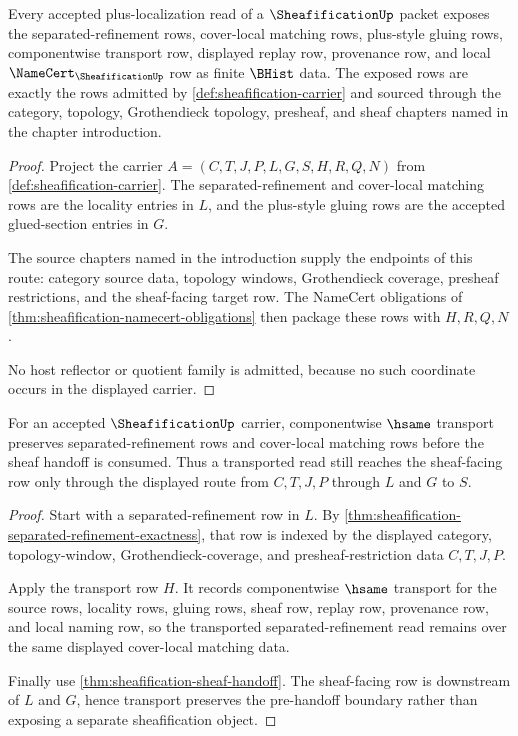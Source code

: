 \begin{theorem}
\label{thm:sheafification-plus-localization-carrier-admission}
Every accepted plus-localization read of a $\SheafificationUp$ packet exposes the separated-refinement rows, cover-local matching rows, plus-style gluing rows, componentwise transport row, displayed replay row, provenance row, and local $\NameCert_{\SheafificationUp}$ row as finite $\BHist$ data. The exposed rows are exactly the rows admitted by \autoref{def:sheafification-carrier} and sourced through the category, topology, Grothendieck topology, presheaf, and sheaf chapters named in the chapter introduction.
\end{theorem}
\begin{proof}
Project the carrier $A=(C,T,J,P,L,G,S,H,R,Q,N)$ from \autoref{def:sheafification-carrier}. The separated-refinement and cover-local matching rows are the locality entries in $L$, and the plus-style gluing rows are the accepted glued-section entries in $G$.

The source chapters named in the introduction supply the endpoints of this route: category source data, topology windows, Grothendieck coverage, presheaf restrictions, and the sheaf-facing target row. The NameCert obligations of \autoref{thm:sheafification-namecert-obligations} then package these rows with $H,R,Q,N$.

No host reflector or quotient family is admitted, because no such coordinate occurs in the displayed carrier.
\end{proof}

\begin{theorem}
\label{thm:sheafification-separated-refinement-transport}
For an accepted $\SheafificationUp$ carrier, componentwise $\hsame$ transport preserves separated-refinement rows and cover-local matching rows before the sheaf handoff is consumed. Thus a transported read still reaches the sheaf-facing row only through the displayed route from $C,T,J,P$ through $L$ and $G$ to $S$.
\end{theorem}
\begin{proof}
Start with a separated-refinement row in $L$. By \autoref{thm:sheafification-separated-refinement-exactness}, that row is indexed by the displayed category, topology-window, Grothendieck-coverage, and presheaf-restriction data $C,T,J,P$.

Apply the transport row $H$. It records componentwise $\hsame$ transport for the source rows, locality rows, gluing rows, sheaf row, replay row, provenance row, and local naming row, so the transported separated-refinement read remains over the same displayed cover-local matching data.

Finally use \autoref{thm:sheafification-sheaf-handoff}. The sheaf-facing row is downstream of $L$ and $G$, hence transport preserves the pre-handoff boundary rather than exposing a separate sheafification object.
\end{proof}

